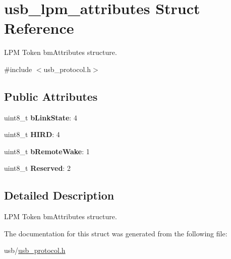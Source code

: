 \hypertarget{structusb__lpm__attributes}{}\section{usb\+\_\+lpm\+\_\+attributes Struct Reference}
\label{structusb__lpm__attributes}


L\+PM Token bm\+Attributes structure.  




{\ttfamily \#include $<$usb\+\_\+protocol.\+h$>$}

\subsection*{Public Attributes}
\begin{DoxyCompactItemize}
\item 
\mbox{\label{structusb__lpm__attributes_a4f30bed607cd07ee7a1eefeed27e43ee}} 
uint8\+\_\+t {\bfseries b\+Link\+State}\+: 4
\item 
\mbox{\label{structusb__lpm__attributes_a2e7c1965759b8c61272815ff055d2d1f}} 
uint8\+\_\+t {\bfseries H\+I\+RD}\+: 4
\item 
\mbox{\label{structusb__lpm__attributes_a2ef1bd1258075140f5d6698078803301}} 
uint8\+\_\+t {\bfseries b\+Remote\+Wake}\+: 1
\item 
\mbox{\label{structusb__lpm__attributes_a8a172fe9827e24312fad0f9b34a831ac}} 
uint8\+\_\+t {\bfseries Reserved}\+: 2
\end{DoxyCompactItemize}


\subsection{Detailed Description}
L\+PM Token bm\+Attributes structure. 

The documentation for this struct was generated from the following file\+:\begin{DoxyCompactItemize}
\item 
usb/\hyperlink{usb__protocol_8h}{usb\+\_\+protocol.\+h}\end{DoxyCompactItemize}
